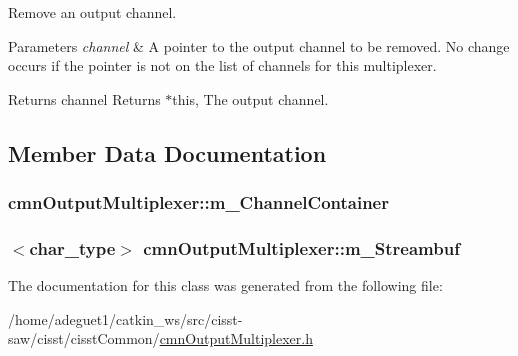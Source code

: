 Remove an output channel. 
\begin{DoxyParams}{Parameters}
{\em channel} & A pointer to the output channel to be removed. No change occurs if the pointer is not on the list of channels for this multiplexer. \\
\hline
\end{DoxyParams}
\begin{DoxyReturn}{Returns}
channel Returns $\ast$this, The output channel. 
\end{DoxyReturn}


\subsection{Member Data Documentation}
\hypertarget{classcmn_output_multiplexer_a2bbdcfbb9a7395c5538432523ade4b1a}{
\subsubsection[{m\-\_\-\-Channel\-Container}]{ cmn\-Output\-Multiplexer\-::m\-\_\-\-Channel\-Container\hspace{0.3cm}{\ttfamily [protected]}}}\label{classcmn_output_multiplexer_a2bbdcfbb9a7395c5538432523ade4b1a}
\hypertarget{classcmn_output_multiplexer_a64c336dbeee16f5d94503c2a4265b97c}{
\subsubsection[{m\-\_\-\-Streambuf}]{$<${\bf char\-\_\-type}$>$ cmn\-Output\-Multiplexer\-::m\-\_\-\-Streambuf\hspace{0.3cm}{\ttfamily [protected]}}}\label{classcmn_output_multiplexer_a64c336dbeee16f5d94503c2a4265b97c}


The documentation for this class was generated from the following file\-:\begin{DoxyCompactItemize}
\item 
/home/adeguet1/catkin\-\_\-ws/src/cisst-\/saw/cisst/cisst\-Common/\hyperlink{cmn_output_multiplexer_8h}{cmn\-Output\-Multiplexer.\-h}\end{DoxyCompactItemize}
